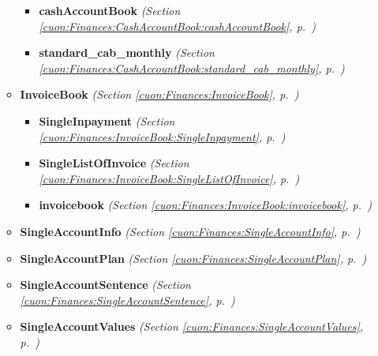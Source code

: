 \begin{itemize}
\begin{itemize}
      \begin{itemize}
    \setlength{\parskip}{0ex}
        \item \textbf{cashAccountBook}
  \textit{(Section \ref{cuon:Finances:CashAccountBook:cashAccountBook}, p.~\pageref{cuon:Finances:CashAccountBook:cashAccountBook})}

        \item \textbf{standard\_cab\_monthly}
  \textit{(Section \ref{cuon:Finances:CashAccountBook:standard_cab_monthly}, p.~\pageref{cuon:Finances:CashAccountBook:standard_cab_monthly})}

      \end{itemize}
    \item \textbf{InvoiceBook}
  \textit{(Section \ref{cuon:Finances:InvoiceBook}, p.~\pageref{cuon:Finances:InvoiceBook})}

      \begin{itemize}
    \setlength{\parskip}{0ex}
        \item \textbf{SingleInpayment}
  \textit{(Section \ref{cuon:Finances:InvoiceBook:SingleInpayment}, p.~\pageref{cuon:Finances:InvoiceBook:SingleInpayment})}

        \item \textbf{SingleListOfInvoice}
  \textit{(Section \ref{cuon:Finances:InvoiceBook:SingleListOfInvoice}, p.~\pageref{cuon:Finances:InvoiceBook:SingleListOfInvoice})}

        \item \textbf{invoicebook}
  \textit{(Section \ref{cuon:Finances:InvoiceBook:invoicebook}, p.~\pageref{cuon:Finances:InvoiceBook:invoicebook})}

      \end{itemize}
    \item \textbf{SingleAccountInfo}
  \textit{(Section \ref{cuon:Finances:SingleAccountInfo}, p.~\pageref{cuon:Finances:SingleAccountInfo})}

    \item \textbf{SingleAccountPlan}
  \textit{(Section \ref{cuon:Finances:SingleAccountPlan}, p.~\pageref{cuon:Finances:SingleAccountPlan})}

    \item \textbf{SingleAccountSentence}
  \textit{(Section \ref{cuon:Finances:SingleAccountSentence}, p.~\pageref{cuon:Finances:SingleAccountSentence})}

    \item \textbf{SingleAccountValues}
  \textit{(Section \ref{cuon:Finances:SingleAccountValues}, p.~\pageref{cuon:Finances:SingleAccountValues})}


\end{itemize}
\end{itemize}
